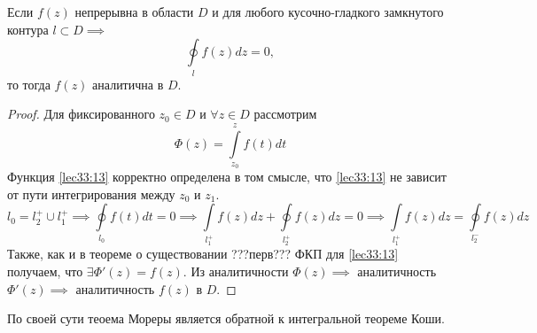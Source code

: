 \documentclass[../../main.tex]{subfiles}
\begin{document}
\begin{thm}[Мореры]
	Если $ f(z) $ непрерывна в области $ D $ и для любого кусочно-гладкого 
	замкнутого контура $ l \subset D \implies $
	\begin{equation}
	\label{lec33:12}
	\oint\limits_l f(z) dz = 0,
	\end{equation}
	то тогда $ f(z) $ аналитична в $ D $.
\end{thm}
\begin{proof}
	Для фиксированного $ z_0 \in D $ и
	$ \forall z \in D $ рассмотрим 
	\begin{equation}
	\label{lec33:13}
	\Phi(z) =
	\int\limits_{z_0}^{z} f(t) dt
	\end{equation}
	Функция \eqref{lec33:13} корректно определена в том смысле, 
	что \eqref{lec33:13} не зависит от пути интегрирования между $z_0$ и $z_1$.\\
	\[
	l_0 = l_2^+ \cup l_1^+ \implies
	\oint\limits_{l_0} f(t) dt = 0 \implies
	\int\limits_{l_1^+} f(z) dz +
	\oint\limits_{l_2^+} f(z) dz = 0 \implies 
	\int\limits_{l_1^+} f(z) dz =
	\oint\limits_{l_2^-} f(z) dz
	\]
	Также, как и в теореме о существовании ???перв???
	ФКП для \eqref{lec33:13} получаем, что $ \exists \Phi'(z) = f(z) $. 
	Из аналитичности $ \Phi(z) \implies $ 
	аналитичность $ \Phi'(z) \implies $
	аналитичность $ f(z) $ в $ D $.
\end{proof}
\begin{rem}
	По своей сути теоема Мореры является обратной
	к интегральной теореме Коши.
\end{rem}
\end{document}
